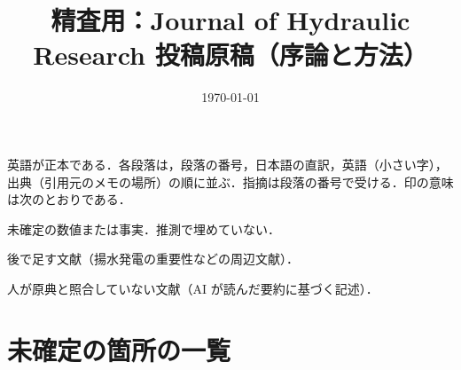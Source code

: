 \documentclass[a4paper,11pt]{ltjsarticle}
\title{精査用：Journal of Hydraulic Research 投稿原稿（序論と方法）}
\author{}
\date{\today}
\begin{document}
\maketitle

\noindent 英語が正本である．各段落は，段落の番号，日本語の直訳，英語（小さい字），出典（引用元のメモの場所）の順に並ぶ．指摘は段落の番号で受ける．印の意味は次のとおりである．

\begin{description}\setlength{\itemsep}{1pt}
\item[\textbf{[TBD: …]}] 未確定の数値または事実．推測で埋めていない．
\item[\textbf{[REF: …]}] 後で足す文献（揚水発電の重要性などの周辺文献）．
\item[\unverified] 人が原典と照合していない文献（AI が読んだ要約に基づく記述）．
\end{description}





\section*{未確定の箇所の一覧}
\printopenitems




\clearpage
\makeatletter\g@addto@macro\@floatboxreset{\footnotesize}\makeatother


\clearpage

\end{document}
